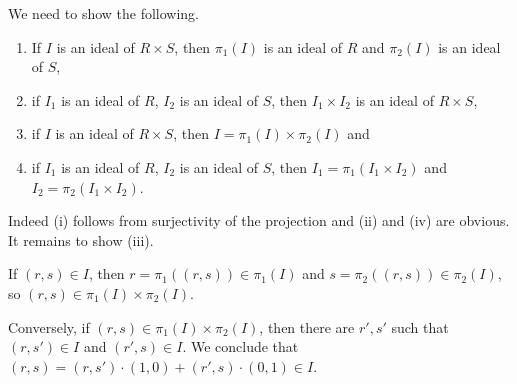We need to show the following.
\begin{enumerate}[label=(\roman*)]
	\item If $I$ is an ideal of $R\times S$, then $\pi_1(I)$ is an ideal of $R$
		and $\pi_2(I)$ is an ideal of $S$,
	\item if $I_1$ is an ideal of $R$, $I_2$ is an ideal of $S$, then
		$I_1\times I_2$ is an ideal of $R\times S$,
	\item if $I$ is an ideal of $R\times S$, then $I = \pi_1(I) \times \pi_2(I)$ and
	\item if $I_1$ is an ideal of $R$, $I_2$ is an ideal of $S$, then
		$I_1 = \pi_1(I_1\times I_2)$ and $I_2 = \pi_2(I_1\times I_2)$.
\end{enumerate}

Indeed (i) follows from surjectivity of the projection and (ii) and (iv) are obvious.
It remains to show (iii).

If $(r, s) \in I$, then $r = \pi_1((r, s)) \in \pi_1(I)$ and $s = \pi_2((r, s)) \in \pi_2(I)$,
so $(r, s) \in \pi_1(I) \times \pi_2(I)$.

Conversely, if $(r, s) \in \pi_1(I)\times \pi_2(I)$, then there are
$r', s'$ such that $(r, s') \in I$ and $(r', s) \in I$. We conclude that
$(r, s) = (r, s') \cdot (1, 0) + (r', s) \cdot (0, 1) \in I$.\qedhere
